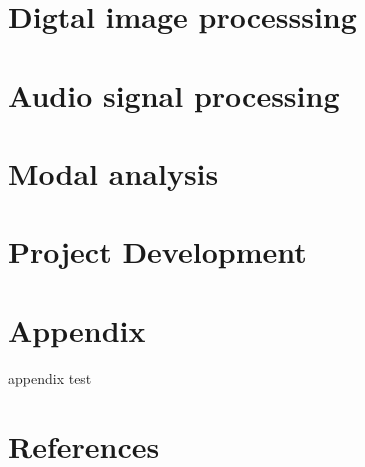 \documentclass[UTF8]{book}
\begin{document}
	
	\part{Digtal image processsing}
	
	\part{Audio signal processing}
	
	\part{Modal analysis}	
	
	\part{Project Development}
	
	\begin{comment} 
	rather stupid, but helpful 
	\chapter{8-channel data acquistion system design}
	\chapter{32-channel data acquistion system design}
	\chapter{64-channel data acquistion system design}
	\end{comment}

	
	\part{Appendix}
	
	appendix test

	\part{References}
	
	
	
\end{document}
